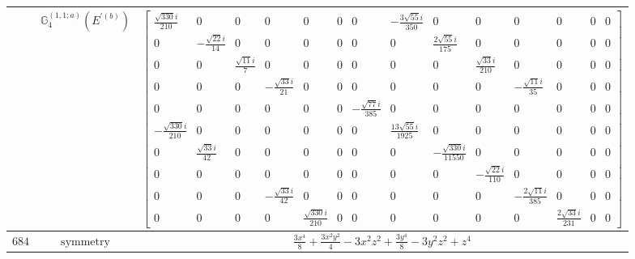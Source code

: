 \documentclass[fleqn,8pt,landscape]{jsarticle}
\begin{document}
\begin{longtable}{ccc}
$  $ & $ \mathbb{G}_{4}^{(1,1;a)}(E^{\prime(b)}) $ & $ \begin{bmatrix} \frac{\sqrt{330} i}{210} & 0 & 0 & 0 & 0 & 0 & 0 & - \frac{3 \sqrt{55} i}{350} & 0 & 0 & 0 & 0 & 0 & 0 \\ 0 & - \frac{\sqrt{22} i}{14} & 0 & 0 & 0 & 0 & 0 & 0 & \frac{2 \sqrt{55} i}{175} & 0 & 0 & 0 & 0 & 0 \\ 0 & 0 & \frac{\sqrt{11} i}{7} & 0 & 0 & 0 & 0 & 0 & 0 & \frac{\sqrt{33} i}{210} & 0 & 0 & 0 & 0 \\ 0 & 0 & 0 & - \frac{\sqrt{33} i}{21} & 0 & 0 & 0 & 0 & 0 & 0 & - \frac{\sqrt{11} i}{35} & 0 & 0 & 0 \\ 0 & 0 & 0 & 0 & 0 & 0 & - \frac{\sqrt{77} i}{385} & 0 & 0 & 0 & 0 & 0 & 0 & 0 \\ - \frac{\sqrt{330} i}{210} & 0 & 0 & 0 & 0 & 0 & 0 & \frac{13 \sqrt{55} i}{1925} & 0 & 0 & 0 & 0 & 0 & 0 \\ 0 & \frac{\sqrt{33} i}{42} & 0 & 0 & 0 & 0 & 0 & 0 & - \frac{\sqrt{330} i}{11550} & 0 & 0 & 0 & 0 & 0 \\ 0 & 0 & 0 & 0 & 0 & 0 & 0 & 0 & 0 & - \frac{\sqrt{22} i}{110} & 0 & 0 & 0 & 0 \\ 0 & 0 & 0 & - \frac{\sqrt{33} i}{42} & 0 & 0 & 0 & 0 & 0 & 0 & - \frac{2 \sqrt{11} i}{385} & 0 & 0 & 0 \\ 0 & 0 & 0 & 0 & \frac{\sqrt{330} i}{210} & 0 & 0 & 0 & 0 & 0 & 0 & \frac{2 \sqrt{33} i}{231} & 0 & 0 \end{bmatrix} $ \\ \hline
$ 684 $ & $ \text{symmetry} $ & $ \frac{3 x^{4}}{8} + \frac{3 x^{2} y^{2}}{4} - 3 x^{2} z^{2} + \frac{3 y^{4}}{8} - 3 y^{2} z^{2} + z^{4} $ \\

\end{longtable}
\end{document}
